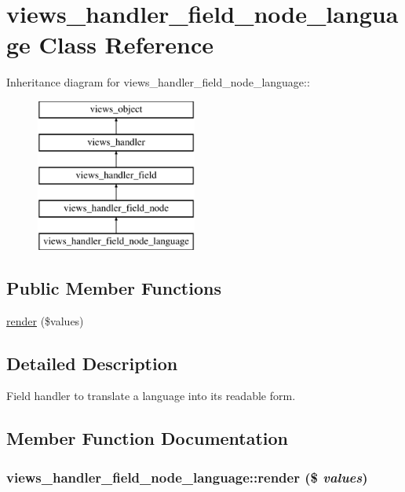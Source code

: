 \hypertarget{classviews__handler__field__node__language}{
\section{views\_\-handler\_\-field\_\-node\_\-language Class Reference}
\label{classviews__handler__field__node__language}
}
Inheritance diagram for views\_\-handler\_\-field\_\-node\_\-language::\begin{figure}[H]
\begin{center}
\leavevmode
\includegraphics[height=5cm]{classviews__handler__field__node__language}
\end{center}
\end{figure}
\subsection*{Public Member Functions}
\begin{CompactItemize}
\item 
\hyperlink{classviews__handler__field__node__language_04be837ecac8fcbbb38fb1a17e45263a}{render} (\$values)
\end{CompactItemize}


\subsection{Detailed Description}
Field handler to translate a language into its readable form. 

\subsection{Member Function Documentation}
\hypertarget{classviews__handler__field__node__language_04be837ecac8fcbbb38fb1a17e45263a}{
\subsubsection[{render}]{\setlength{\rightskip}{0pt plus 5cm}views\_\-handler\_\-field\_\-node\_\-language::render (\$ {\em values})}}
\label{classviews__handler__field__node__language_04be837ecac8fcbbb38fb1a17e45263a}


